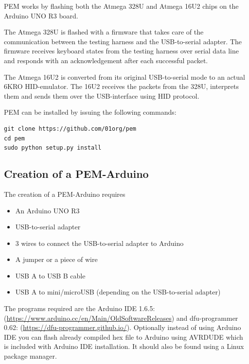 \documentclass[a4paper,11pt]{article}
\begin{document}
PEM works by flashing both the Atmega 328U and Atmega 16U2 chips on the Arduino UNO R3 board. 

The Atmega 328U is flashed with a firmware that takes care of the communication between the testing harness and the USB-to-serial adapter. The firmware receives keyboard states from the testing harness over serial data line and responds with an acknowledgement after each successful packet.

The Atmega 16U2 is converted from its original USB-to-serial mode to an actual 6KRO HID-emulator. The 16U2 receives the packets from the 328U, interprets them and sends them over the USB-interface using HID protocol.

PEM can be installed by issuing the following commands:
\begin{lstlisting}
git clone https://github.com/01org/pem
cd pem
sudo python setup.py install
\end{lstlisting}

\subsection{Creation of a PEM-Arduino}
\label{pemarduino}
The creation of a PEM-Arduino requires 
\begin{itemize}
\item An Arduino UNO R3
\item USB-to-serial adapter
\item 3 wires to connect the USB-to-serial adapter to Arduino
\item A jumper or a piece of wire
\item USB A to USB B cable
\item USB A to mini/microUSB (depending on the USB-to-serial adapter)
\end{itemize}

The programs required are the Arduino IDE 1.6.5: (\url{https://www.arduino.cc/en/Main/OldSoftwareReleases}) and dfu-programmer 0.62: (\url{https://dfu-programmer.github.io/}). Optionally instead of using Arduino IDE you can flash already compiled hex file to Arduino using AVRDUDE which is included with Arduino IDE installation. It should also be found using a Linux package manager.
\end{document}
